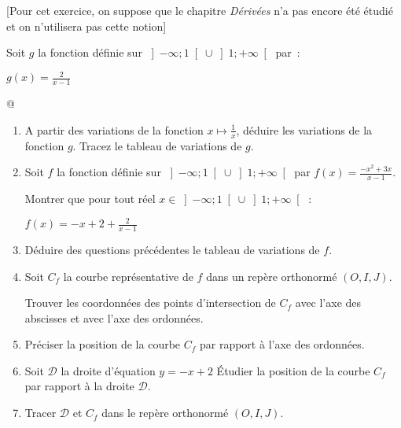 
%
[Pour cet exercice, on suppose que le chapitre \textit{Dérivées} n'a pas encore été étudié et on n'utilisera pas cette notion]
\par
Soit $g$ la fonction définie sur $\left]-\infty  ; 1\right[ \cup  \left]1 ; +\infty \right[$ par~:

\begin{center}
$g\left(x\right)=\frac{2}{x-1}$
\end{center}@

\begin{enumerate}
     \item
     A partir des variations de la fonction $x \mapsto  \frac{1}{x}$, déduire les variations de la fonction $g$. Tracez le tableau de variations de $g$.
     \item
     Soit $f$ la fonction définie sur $\left]-\infty  ; 1\right[ \cup  \left]1 ; +\infty \right[$ par $f\left(x\right)=\frac{-x^{2}+3x}{x-1}$.
     \par
     Montrer que pour tout réel $x \in  \left]-\infty  ; 1\right[ \cup  \left]1 ; +\infty \right[$ :
     \par
     $f\left(x\right)=-x+2+\frac{2}{x-1}$
     \item
     Déduire des questions précédentes le tableau de variations de $f$.
     \item
     Soit $C_{f}$ la courbe représentative de $f$ dans un repère orthonormé $\left(O, I, J\right)$.
     \par
     Trouver les coordonnées des points d'intersection de $C_{f}$ avec l'axe des abscisses et avec l'axe des ordonnées.
     \item
     Préciser la position de la courbe  $C_{f}$ par rapport à l'axe des ordonnées.
     \item
     Soit $\mathscr D$ la droite d'équation $y=-x+2$ Étudier la position de la courbe  $C_{f}$ par rapport à la droite $\mathscr D$.
     \item
     Tracer $\mathscr D$ et  $C_{f}$ dans le repère orthonormé $\left(O, I, J\right)$.
\end{enumerate}


